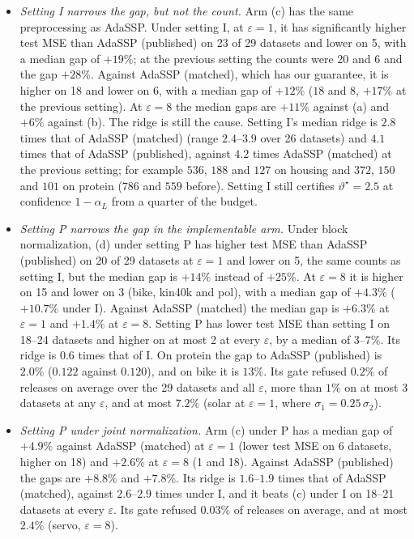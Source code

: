 \documentclass[11pt]{article}
\theoremstyle{definition}
\theoremstyle{plain}
\begin{document}
\begin{itemize}
  \item \emph{Setting I narrows the gap, but not the count.} Arm (c) has the same preprocessing as AdaSSP. Under setting I, at $\varepsilon = 1$, it has significantly higher test MSE than AdaSSP (published) on 23 of 29 datasets and lower on 5, with a median gap of $+19\%$; at the previous setting the counts were 20 and 6 and the gap $+28\%$. Against AdaSSP (matched), which has our guarantee, it is higher on 18 and lower on 6, with a median gap of $+12\%$ ($18$ and $8$, $+17\%$ at the previous setting). At $\varepsilon = 8$ the median gaps are $+11\%$ against (a) and $+6\%$ against (b). The ridge is still the cause. Setting I's median ridge is $2.8$ times that of AdaSSP (matched) (range $2.4$--$3.9$ over 26 datasets) and $4.1$ times that of AdaSSP (published), against $4.2$ times AdaSSP (matched) at the previous setting; for example $536$, $188$ and $127$ on housing and $372$, $150$ and $101$ on protein ($786$ and $559$ before). Setting I still certifies $\vartheta^\star = 2.5$ at confidence $1 - \alpha_L$ from a quarter of the budget.
  \item \emph{Setting P narrows the gap in the implementable arm.} Under block normalization, (d) under setting P has higher test MSE than AdaSSP (published) on 20 of 29 datasets at $\varepsilon = 1$ and lower on 5, the same counts as setting I, but the median gap is $+14\%$ instead of $+25\%$. At $\varepsilon = 8$ it is higher on 15 and lower on 3 (bike, kin40k and pol), with a median gap of $+4.3\%$ ($+10.7\%$ under I). Against AdaSSP (matched) the median gap is $+6.3\%$ at $\varepsilon = 1$ and $+1.4\%$ at $\varepsilon = 8$. Setting P has lower test MSE than setting I on 18--24 datasets and higher on at most 2 at every $\varepsilon$, by a median of $3$--$7\%$. Its ridge is $0.6$ times that of I. On protein the gap to AdaSSP (published) is $2.0\%$ ($0.122$ against $0.120$), and on bike it is $13\%$. Its gate refused $0.2\%$ of releases on average over the 29 datasets and all $\varepsilon$, more than $1\%$ on at most 3 datasets at any $\varepsilon$, and at most $7.2\%$ (solar at $\varepsilon = 1$, where $\sigma_1 = 0.25\,\sigma_2$).
  \item \emph{Setting P under joint normalization.} Arm (c) under P has a median gap of $+4.9\%$ against AdaSSP (matched) at $\varepsilon = 1$ (lower test MSE on 6 datasets, higher on 18) and $+2.6\%$ at $\varepsilon = 8$ (1 and 18). Against AdaSSP (published) the gaps are $+8.8\%$ and $+7.8\%$. Its ridge is $1.6$--$1.9$ times that of AdaSSP (matched), against $2.6$--$2.9$ times under I, and it beats (c) under I on 18--21 datasets at every $\varepsilon$. Its gate refused $0.03\%$ of releases on average, and at most $2.4\%$ (servo, $\varepsilon = 8$).

\end{itemize}
\end{document}
